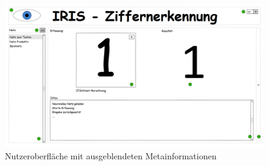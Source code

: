 \begin{figure}[ht]
	\centering
	\includegraphics[height=0.8\textwidth, angle=90]{Abbildungen/UI-Mocks/Main-Ui-Minimized.png}
	\caption{Nutzeroberfläche mit ausgeblendeten Metainformationen}
	\label{ui-min}
\end{figure}

